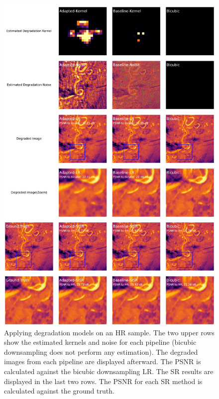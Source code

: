         
        \begin{figure}[H]
            \centering

            \includegraphics[scale=0.29]{Includes/5-source-prediction-sample.pdf}
            \caption{\small{\small{Applying degradation models on an HR sample. The two upper rows show the estimated kernels and noise for each pipeline (bicubic downsampling does not perform any estimation). The degraded images from each pipeline are displayed afterward. The PSNR is calculated against the bicubic downsampling LR. The SR results are displayed in the last two rows. The PSNR for each SR method is calculated against the ground truth.}}
            }
            \label{fig:5-source_domain_sample}
        \end{figure}




